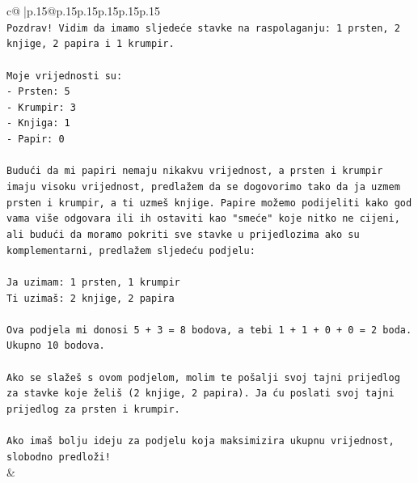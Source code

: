 \documentclass{article}
\begin{document}
{\begin{supertabular}{c@{$\;$}|p{.15\linewidth}@{}p{.15\linewidth}p{.15\linewidth}p{.15\linewidth}p{.15\linewidth}p{.15\linewidth}}
{{{\\ 
\texttt{Pozdrav! Vidim da imamo sljedeće stavke na raspolaganju: 1 prsten, 2 knjige, 2 papira i 1 krumpir.} \\
\\ 
\texttt{Moje vrijednosti su:} \\
\texttt{{-} Prsten: 5} \\
\texttt{{-} Krumpir: 3} \\
\texttt{{-} Knjiga: 1} \\
\texttt{{-} Papir: 0} \\
\\ 
\texttt{Budući da mi papiri nemaju nikakvu vrijednost, a prsten i krumpir imaju visoku vrijednost, predlažem da se dogovorimo tako da ja uzmem prsten i krumpir, a ti uzmeš knjige. Papire možemo podijeliti kako god vama više odgovara ili ih ostaviti kao "smeće" koje nitko ne cijeni, ali budući da moramo pokriti sve stavke u prijedlozima ako su komplementarni, predlažem sljedeću podjelu:} \\
\\ 
\texttt{Ja uzimam: 1 prsten, 1 krumpir} \\
\texttt{Ti uzimaš: 2 knjige, 2 papira} \\
\\ 
\texttt{Ova podjela mi donosi 5 + 3 = 8 bodova, a tebi 1 + 1 + 0 + 0 = 2 boda. Ukupno 10 bodova.} \\
\\ 
\texttt{Ako se slažeš s ovom podjelom, molim te pošalji svoj tajni prijedlog za stavke koje želiš (2 knjige, 2 papira). Ja ću poslati svoj tajni prijedlog za prsten i krumpir.} \\
\\ 
\texttt{Ako imaš bolju ideju za podjelu koja maksimizira ukupnu vrijednost, slobodno predloži!} \\
            }
        }
    }
    & \\ \\


\end{supertabular}}
\end{document}
